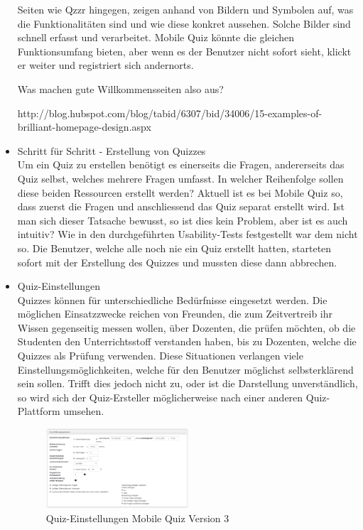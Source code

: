\begin{itemize}
		Seiten wie Qzzr \cite{qzzr.com} hingegen, zeigen anhand von Bildern und Symbolen auf, was die Funktionalitäten sind und wie diese konkret aussehen. Solche Bilder sind schnell erfasst  und verarbeitet.
		Mobile Quiz könnte die gleichen Funktionsumfang bieten, aber wenn es der Benutzer nicht sofort sieht, klickt er weiter und registriert sich andernorts.
		
		Was machen gute Willkommensseiten also aus?
		
		http://blog.hubspot.com/blog/tabid/6307/bid/34006/15-examples-of-brilliant-homepage-design.aspx
		
		
		\item Schritt für Schritt - Erstellung von Quizzes \\
		Um ein Quiz zu erstellen benötigt es einerseits die Fragen, andererseits das Quiz selbst, welches mehrere Fragen umfasst. In welcher Reihenfolge sollen diese beiden Ressourcen erstellt werden?
		Aktuell ist es bei Mobile Quiz so, dass zuerst die Fragen und anschliessend das Quiz separat erstellt wird. Ist man sich dieser Tatsache bewusst, so ist dies kein Problem, aber ist es auch intuitiv? Wie in den durchgeführten Usability-Tests festgestellt war dem nicht so. Die Benutzer, welche alle noch nie ein Quiz erstellt hatten, starteten sofort mit der Erstellung des Quizzes und mussten diese dann abbrechen.
		
		
		
		
		
		\item  Quiz-Einstellungen \\
		Quizzes können für unterschiedliche Bedürfnisse eingesetzt werden. Die möglichen Einsatzzwecke reichen von Freunden, die zum Zeitvertreib ihr Wissen gegenseitig messen wollen, über Dozenten, die prüfen möchten, ob die Studenten den Unterrichtsstoff verstanden haben, bis zu Dozenten, welche die Quizzes als Prüfung verwenden.
		Diese Situationen verlangen viele Einstellungsmöglichkeiten, welche für den Benutzer möglichst selbsterklärend sein sollen. Trifft dies jedoch nicht zu, oder ist die Darstellung unverständlich, so wird sich der Quiz-Ersteller möglicherweise nach einer anderen Quiz-Plattform umsehen.
		
		\begin{figure}[h]
			\centering
			\includegraphics[width=0.5\textwidth
			]{Images/MobileQuiz_Quiz-Settings.PNG}
			\caption{Quiz-Einstellungen Mobile Quiz Version 3}
		\end{figure}
		

\end{itemize}
